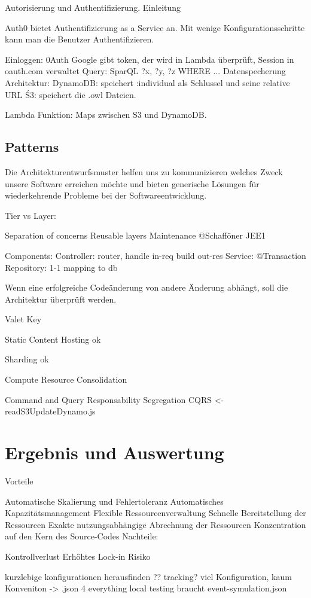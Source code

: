 \documentclass[
12pt,
english,
ngerman,
headsepline,
twoside,
openright,
numbers=noenddot,version=first
]{scrreprt}
\begin{document}
Autorisierung und Authentifizierung. Einleitung

Auth0 bietet Authentifizierung as a Service an. Mit wenige Konfigurationsschritte kann man die Benutzer Authentifizieren. 


Einloggen: 0Auth Google gibt token, der wird in Lambda überprüft, Session in oauth.com verwaltet
Query: SparQL ?x, ?y, ?z WHERE ...
Datenspecherung Architektur:
DynamoDB: speichert :individual als Schlussel und seine relative URL
Ś3: speichert die .owl Dateien.

Lambda Funktion: Maps zwischen S3 und DynamoDB.

\section{Patterns}

Die Architekturentwurfsmuster helfen uns zu kommunizieren welches Zweck unsere Software erreichen möchte und bieten generische Lösungen für wiederkehrende Probleme bei der Softwareentwicklung.

Tier vs Layer: \cite{sbarski2017serverless}

Separation of concerns
Reusable layers
Maintenance @Schafföner JEE1

Components: 
Controller: router, handle in-req build out-res
Service: @Transaction
Repository: 1-1 mapping to db

Wenn eine erfolgreiche Codeänderung von andere Änderung abhängt, soll die Architektur überprüft werden. 

Valet Key \cite{homer2014cloud}

Static Content Hosting ok

Sharding ok

Compute Resource Consolidation 

Command and Query Responsability Segregation CQRS <- readS3UpdateDynamo.js

\chapter{Ergebnis und Auswertung}
Vorteile

Automatische Skalierung und Fehlertoleranz
Automatisches Kapazitätsmanagement
Flexible Ressourcenverwaltung
Schnelle Bereitstellung der Ressourcen
Exakte nutzungsabhängige Abrechnung der Ressourcen
Konzentration auf den Kern des Source-Codes
Nachteile:

Kontrollverlust
Erhöhtes Lock-in Risiko

kurzlebige konfigurationen herausfinden ?? tracking?
viel Konfiguration, kaum Konveniton -> .json 4 everything
local testing braucht event-symulation.json
\end{document}
